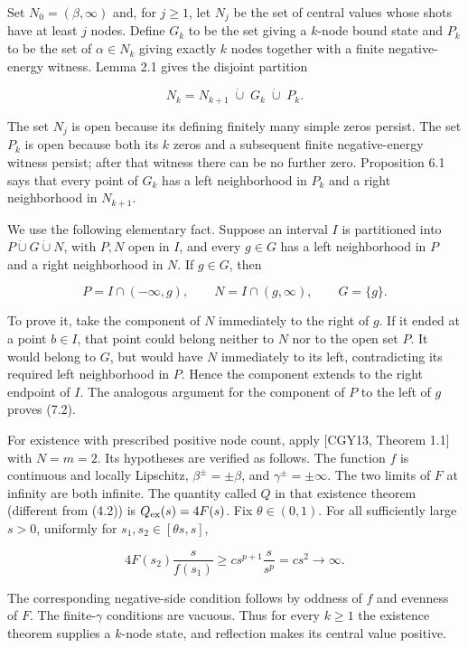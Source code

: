 \documentclass[11pt]{article}
\begin{document}
Set \(N_0=(\beta,\infty)\) and, for \(j\geq1\), let \(N_j\) be the set
of central values whose shots have at least \(j\) nodes. Define \(G_k\)
to be the set giving a \(k\)-node bound state and \(P_k\) to be the set
of \(\alpha\in N_k\) giving exactly \(k\) nodes together with a finite
negative-energy witness. Lemma 2.1 gives the disjoint partition

\[N_k=N_{k+1}\;\dot\cup\;G_k\;\dot\cup\;P_k. \tag{7.1}\]

The set \(N_j\) is open because its defining finitely many simple zeros
persist. The set \(P_k\) is open because both its \(k\) zeros and a
subsequent finite negative-energy witness persist; after that witness
there can be no further zero. Proposition 6.1 says that every point of
\(G_k\) has a left neighborhood in \(P_k\) and a right neighborhood in
\(N_{k+1}\).

We use the following elementary fact. Suppose an interval \(I\) is
partitioned into \(P\dot\cup G\dot\cup N\), with \(P,N\) open in \(I\),
and every \(g\in G\) has a left neighborhood in \(P\) and a right
neighborhood in \(N\). If \(g\in G\), then

\[P=I\cap(-\infty,g),\qquad N=I\cap(g,\infty),\qquad G=\{g\}. \tag{7.2}\]

To prove it, take the component of \(N\) immediately to the right of
\(g\). If it ended at a point \(b\in I\), that point could belong
neither to \(N\) nor to the open set \(P\). It would belong to \(G\),
but would have \(N\) immediately to its left, contradicting its required
left neighborhood in \(P\). Hence the component extends to the right
endpoint of \(I\). The analogous argument for the component of \(P\) to
the left of \(g\) proves (7.2).

For existence with prescribed positive node count, apply {[}CGY13,
Theorem 1.1{]} with \(N=m=2\). Its hypotheses are verified as follows.
The function \(f\) is continuous and locally Lipschitz,
\(\beta^\pm=\pm\beta\), and \(\gamma^\pm=\pm\infty\). The two limits of
\(F\) at infinity are both infinite. The quantity called \(Q\) in that
existence theorem (different from (4.2)) is \(Q_{\rm ex}(s)=4F(s)\). Fix
\(\theta\in(0,1)\). For all sufficiently large \(s>0\), uniformly for
\(s_1,s_2\in[\theta s,s]\),

\[4F(s_2)\frac{s}{f(s_1)}\geq c s^{p+1}\frac{s}{s^p}=cs^2\longrightarrow\infty.\]

The corresponding negative-side condition follows by oddness of \(f\)
and evenness of \(F\). The finite-\(\gamma\) conditions are vacuous.
Thus for every \(k\geq1\) the existence theorem supplies a \(k\)-node
state, and reflection makes its central value positive.
\end{document}
